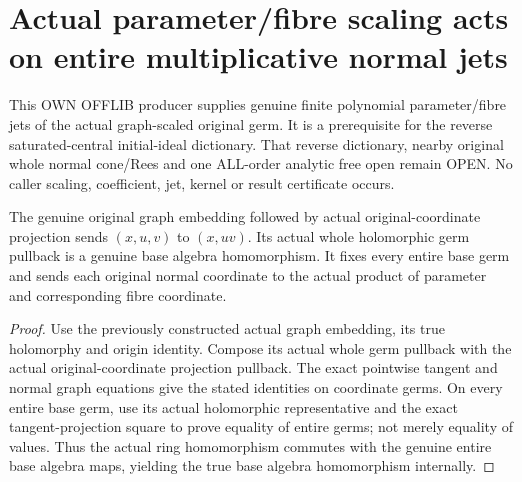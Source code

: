 \section{Actual parameter/fibre scaling acts on entire multiplicative normal jets}
This OWN OFFLIB producer supplies genuine finite polynomial parameter/fibre jets of the actual graph-scaled original germ. It is a prerequisite for the reverse saturated-central initial-ideal dictionary. That reverse dictionary, nearby original whole normal cone/Rees and one ALL-order analytic free open remain OPEN. No caller scaling, coefficient, jet, kernel or result certificate occurs.

\begin{lemma}
\label{hir:relative-normal-graph-jets-actual-scaling}
\leanok
{}
The genuine original graph embedding followed by actual original-coordinate projection sends $(x,u,v)$ to $(x,uv)$. Its actual whole holomorphic germ pullback is a genuine base algebra homomorphism. It fixes every entire base germ and sends each original normal coordinate to the actual product of parameter and corresponding fibre coordinate.
\end{lemma}
\begin{proof}
Use the previously constructed actual graph embedding, its true holomorphy and origin identity. Compose its actual whole germ pullback with the actual original-coordinate projection pullback. The exact pointwise tangent and normal graph equations give the stated identities on coordinate germs. On every entire base germ, use its actual holomorphic representative and the exact tangent-projection square to prove equality of entire germs; not merely equality of values. Thus the actual ring homomorphism commutes with the genuine entire base algebra maps, yielding the true base algebra homomorphism internally.
\end{proof}

